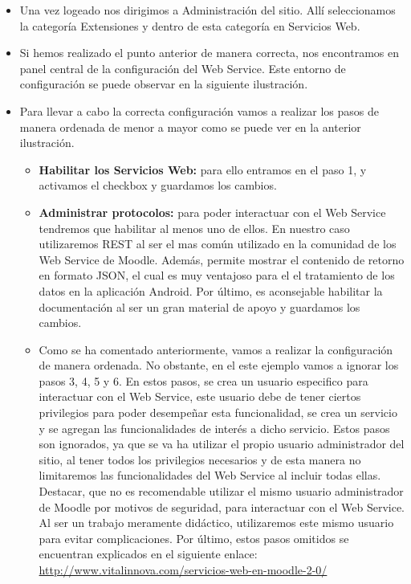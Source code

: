 \begin{itemize}

	\item Una vez logeado nos dirigimos a Administración del sitio. Allí seleccionamos la categoría Extensiones y dentro de esta categoría en Servicios Web.
	\item Si hemos realizado el punto anterior de manera correcta, nos encontramos en panel central de la configuración del Web Service. Este entorno de configuración se puede observar en la siguiente ilustración.
	
	\item Para llevar a cabo la correcta configuración vamos a realizar los pasos de manera ordenada de menor a mayor como se puede ver en la anterior ilustración. 
	\begin{itemize}
	
		\item \textbf{Habilitar los Servicios Web:} para ello entramos en el paso 1, y activamos el checkbox y guardamos los cambios.
		
		\item \textbf{Administrar protocolos:} para poder interactuar con el Web Service tendremos que habilitar al menos uno de ellos. En nuestro caso utilizaremos REST al ser el mas común utilizado en la comunidad de los Web Service de Moodle. Además, permite mostrar el contenido de retorno en formato JSON, el cual es muy ventajoso para el el tratamiento de los datos en la aplicación Android. Por último, es aconsejable habilitar la documentación al ser un gran material de apoyo y guardamos los cambios.
		
		\item Como se ha comentado anteriormente, vamos a realizar la configuración de manera ordenada. No obstante, en el este ejemplo vamos a ignorar los pasos 3, 4, 5 y 6. En estos pasos, se crea un usuario especifico para interactuar con el Web Service, este usuario debe de tener ciertos privilegios para poder desempeñar esta funcionalidad, se crea un servicio y se agregan las funcionalidades de interés a dicho servicio. Estos pasos son ignorados, ya que se va ha utilizar el propio usuario administrador del sitio, al tener todos los privilegios necesarios y de esta manera no limitaremos las funcionalidades del Web Service al incluir todas ellas. Destacar, que no es recomendable utilizar el mismo usuario administrador de Moodle por motivos de seguridad, para interactuar con el Web Service. Al ser un trabajo meramente didáctico, utilizaremos este mismo usuario para evitar complicaciones.
Por último, estos pasos omitidos se encuentran explicados en el siguiente enlace:
\url{http://www.vitalinnova.com/servicios-web-en-moodle-2-0/}
		

\end{itemize}
\end{itemize}

